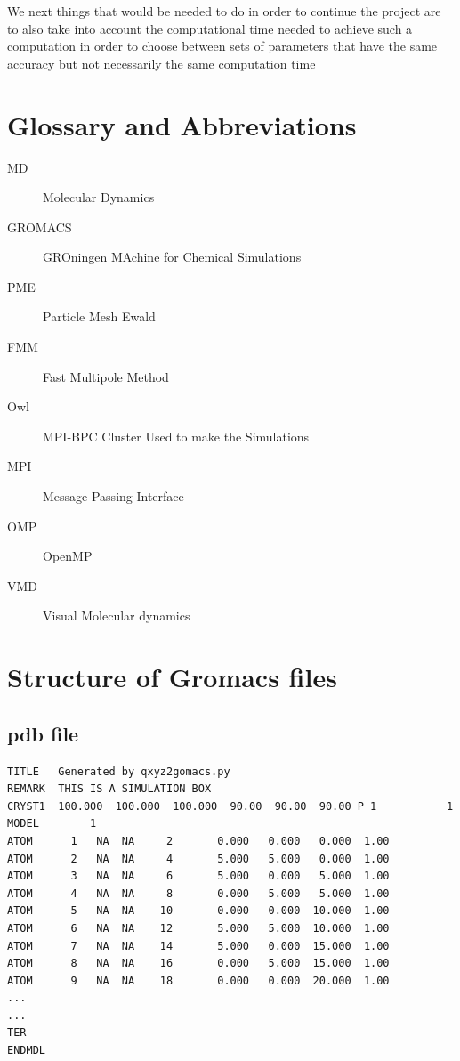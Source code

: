 \documentclass[10pt,twoside,a4paper]{report}
\begin{document}
We next things that would be needed to do in order to continue the project are to also take into account the computational time needed to achieve such a computation in order to choose between sets of parameters that have the same accuracy but not necessarily the same computation time
	
	
	
	

\nocite{*}

 

\begin{appendices}
\chapter{Glossary and Abbreviations}

\begin{description}


\item[MD]  Molecular Dynamics
\item[GROMACS] GROningen MAchine for Chemical Simulations
\item[PME] Particle Mesh Ewald
\item[FMM] Fast Multipole Method
\item[Owl] MPI-BPC Cluster Used to make the Simulations

\item[MPI] Message Passing Interface
\item[OMP] OpenMP
\item[VMD] Visual Molecular dynamics


\end{description}


\chapter{Structure of Gromacs files}

\section{pdb file}

\begin{verbatim}
TITLE	Generated by qxyz2gomacs.py
REMARK	THIS IS A SIMULATION BOX
CRYST1  100.000  100.000  100.000  90.00  90.00  90.00 P 1           1
MODEL        1
ATOM      1   NA  NA     2       0.000   0.000   0.000  1.00
ATOM      2   NA  NA     4       5.000   5.000   0.000  1.00
ATOM      3   NA  NA     6       5.000   0.000   5.000  1.00
ATOM      4   NA  NA     8       0.000   5.000   5.000  1.00
ATOM      5   NA  NA    10       0.000   0.000  10.000  1.00
ATOM      6   NA  NA    12       5.000   5.000  10.000  1.00
ATOM      7   NA  NA    14       5.000   0.000  15.000  1.00
ATOM      8   NA  NA    16       0.000   5.000  15.000  1.00
ATOM      9   NA  NA    18       0.000   0.000  20.000  1.00
...
...
TER
ENDMDL
\end{verbatim}


\end{appendices}
\end{document}
